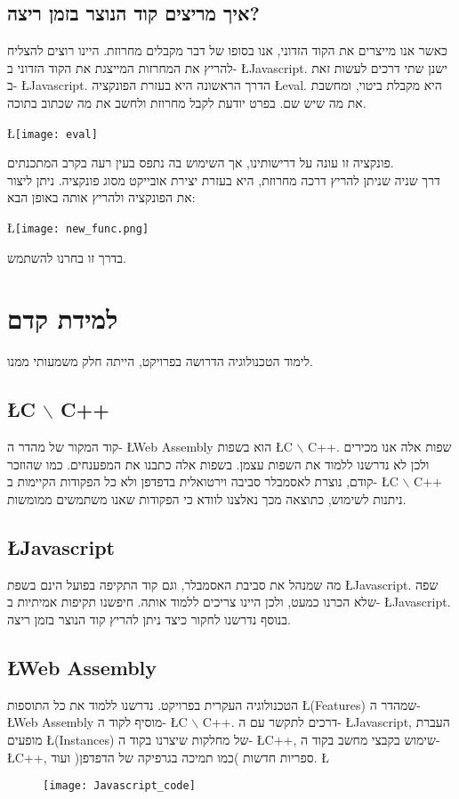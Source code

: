 \documentclass{article}
\begin{document}
		\subsection{איך מריצים קוד הנוצר בזמן ריצה?} 
		כאשר אנו מייצרים את הקוד הזדוני, אנו בסופו של דבר מקבלים מחרוזת. 
		היינו רוצים להצליח להריץ את המחרזות המייצגת את הקוד הזדוני ב- 
		\L{Javascript}. 
		ישנן שתי דרכים לעשות זאת ב- 
		\L{Javascript}. 
		הדרך הראשונה היא בעזרת הפונקציה 
		\L{eval}. 
		היא מקבלת ביטוי, ומחשבת את מה שיש שם. בפרט יודעת לקבל מחרוזת ולחשב את מה שכתוב בתוכה. 
\begin{center}
			\L{\texttt{[image: eval]}}
\end{center}
		פונקציה זו עונה על דרישותינו, אך השימוש בה נתפס בעין רעה בקרב המתכנתים.\\ 
		דרך שניה שניתן להריץ דרכה מחרוזת, היא בעזרת יצירת אובייקט מסוג פונקציה. ניתן ליצור את הפונקציה ולהריץ אותה באופן הבא:  
\begin{center}
			\L{\texttt{[image: new\_func.png]}}
\end{center}
		בדרך זו בחרנו להשתמש. 
		\section{למידת קדם}
		לימוד הטכנולוגיה הדרושה בפרויקט, הייתה חלק משמעותי ממנו. 
		\subsection{\L{C $\backslash$ C++}}
		קוד המקור של מהדר ה-
		\L{Web Assembly} 
		הוא בשפות 
		\L{C $\backslash$ C++}. 
		שפות אלה אנו מכירים ולכן לא נדרשנו ללמוד את השפות עצמן. 
		בשפות אלה כתבנו את המפענחים. 
		כמו שהוזכר קודם, נוצרת לאסמבלר סביבה וירטואלית בדפדפן ולא כל הפקודות הקיימות ב-
		\L{C $\backslash$ C++} 
		ניתנות לשימוש, כתוצאה מכך נאלצנו לוודא כי הפקודות שאנו משתמשים ממומשות. 

		\subsection{\L{Javascript}} 
		מה שמנהל את סביבת האסמבלר, וגם קוד התקיפה בפועל הינם בשפת 
		\L{Javascript}. 
		שפה שלא הכרנו כמעט, ולכן היינו צריכים ללמוד אותה. 
		חיפשנו תקיפות אמיתיות ב- 
		\L{Javascript}. 
		בנוסף נדרשנו לחקור כיצד ניתן להריץ קוד הנוצר בזמן ריצה. 
		
		\subsection{\L{Web Assembly}} 
		הטכנולוגיה העקרית בפרויקט. נדרשנו ללמוד את כל התוספות 
		\L{(Features)} 
		שמהדר ה- 
		\L{Web Assembly} 
		מוסיף לקוד ה- 
		\L{C $\backslash$ C++}. 
		דרכים לתקשר עם ה- 
		\L{Javascript}, 
		העברת מופעים 
		\L{(Instances)} 
		של מחלקות שיצרנו בקוד ה- 
		\L{C++}, 
		שימוש בקבצי מחשב בקוד ה- 
		\L{C++}, 
		ספריות חדשות )כמו תמיכה בגרפיקה של הדפדפן( ועוד. 
	\L{\begin{figure}[h]
		\centering
		\texttt{[image: Javascript\_code]}
	\end{figure}}
\end{document}
